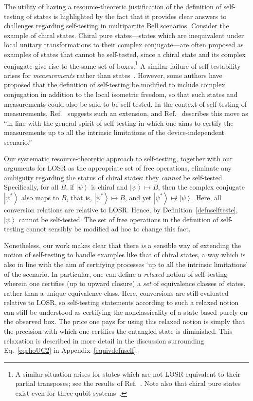 \documentclass[12pt]{article}
\newcommand{\ket}[1]{\left| #1 \right>}
\theoremstyle{plain}
\theoremstyle{definition}
\begin{document}
The utility of having a resource-theoretic
 justification of the definition of self-testing of states
is highlighted by the fact that it provides clear answers to challenges regarding self-testing in multipartite Bell scenarios. Consider the example of chiral states.
Chiral pure states---states which are inequivalent under local unitary transformations to their complex conjugate---are often proposed as examples of states that cannot be self-tested, since a chiral state and its complex conjugate give rise to the same set of boxes.\footnote{A similar situation arises for states which are not LOSR-equivalent to their partial transposes; see the results of Ref.~\cite{Hiraxh2020PPT}. Note also that chiral pure states exist even for three-qubit systems~\cite{Acin2000triclassify,Acin2001puretriclassify}.} A similar failure of self-testability arises for {\em measurements} rather than states~\cite{mckague2010generalized}.
However, some authors have proposed that the definition of self-testing be modified to include complex conjugation in addition to the  local isometric freedom, so that such states and measurements could also be said to be self-tested. In the context of self-testing of measurements, Ref.~\cite{mckague2010generalized} suggests such an extension, and Ref.~\cite{vsupic2020self} describes this move as ``in line with the general spirit of self-testing in which one aims to certify the measurements up to all the intrinsic limitations of the device-independent scenario.''  

Our systematic resource-theoretic approach to self-testing, together with our arguments for LOSR as the appropriate set of free operations, eliminate any ambiguity regarding the status of chiral states: they {\em cannot} be self-tested.  Specifically, for all $B$, if $\ket \psi$ is chiral and $\ket{\psi} \mapsto B $, then the complex conjugate $\ket{\psi^*}$ also maps to $B$, that is, $\ket{\psi^*} \mapsto B $, and yet $\ket{\psi^*} \not\mapsto \ket{\psi}$.  Here, all conversion relations are relative to LOSR. Hence, by Definition~\ref{defnselfteste}, $\ket{\psi}$ cannot be self-tested. The set of free operations in the definition of self-testing cannot sensibly be modified ad hoc to change this fact.

Nonetheless, our work makes clear that there {\em is} a sensible way of extending the notion of self-testing to handle examples like that of chiral states, a way which is also in line with the aim of certifying processes `up to all the intrinsic limitations' of the scenario. In particular, one can define a {\em relaxed} notion of self-testing wherein one certifies (up to upward closure) a {\em set} of equivalence classes of states, rather than a unique equivalence class. Here, conversions are still evaluated relative to LOSR, so self-testing statements according to such a relaxed notion can still be understood as certifying the nonclassicality of a state based purely on the observed box. The price one pays for using this relaxed notion is simply that the precision with which one certifies the entangled state is diminished. This relaxation is described in more detail in the discussion surrounding Eq.~\eqref{eqrhoUC2} in Appendix~\ref{equivdefnself}.
\end{document}
